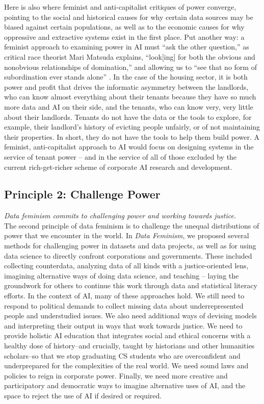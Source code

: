 Here is also where feminist and anti-capitalist critiques of power converge, pointing to the social and historical causes for why certain data sources may be biased against certain populations, as well as to the economic causes for why oppressive and extractive systems exist in the first place. Put another way: a feminist approach to examining power in AI must “ask the other question,” as critical race theorist Mari Matsuda explains, “look[ing] for both the obvious and nonobvious relationships of domination,” and allowing us to “see that no form of subordination ever stands alone” \cite{Matsuda_1991}. In the case of the housing sector, it is both power and profit that drives the informatic asymmetry between the landlords, who can know almost everything about their tenants because they have so much more data and AI on their side, and the tenants, who can know very, very little about their landlords. Tenants do not have the data or the tools to explore, for example, their landlord’s history of evicting people unfairly, or of not maintaining their properties. In short, they do not have the tools to help them build power. A feminist, anti-capitalist approach to AI would focus on designing systems in the service of tenant power – and in the service of all of those excluded by the current rich-get-richer scheme of corporate AI research and development. 
	
\subsection{Principle 2: Challenge Power}

\textit{Data feminism commits to challenging power and working towards justice.}
\\[5pt]
The second principle of data feminism is to challenge the unequal distributions of power that we encounter in the world. 
In \textit{Data Feminism}, we proposed several methods for challenging power in datasets and data projects, as well as for using data science to directly confront corporations and governments. These included collecting counterdata, analyzing data of all kinds with a justice-oriented lens, imagining alternative ways of doing data science, and teaching – laying the groundwork for others to continue this work through data and statistical literacy efforts. In the context of AI, many of these approaches hold. We still need to respond to political demands to collect missing data about underrepresented people and understudied issues. We also need additional ways of devising models and interpreting their output in ways that work towards justice. We need to provide holistic AI education that integrates social and ethical concerns with a healthy dose of history–and crucially, taught by historians and other humanities scholars–so that we stop graduating CS students who are overconfident and underprepared for the complexities of the real world. We need sound laws and policies to reign in corporate power. Finally, we need more creative and participatory and democratic ways to imagine alternative uses of AI, and the space to reject the use of AI if desired or required.  

